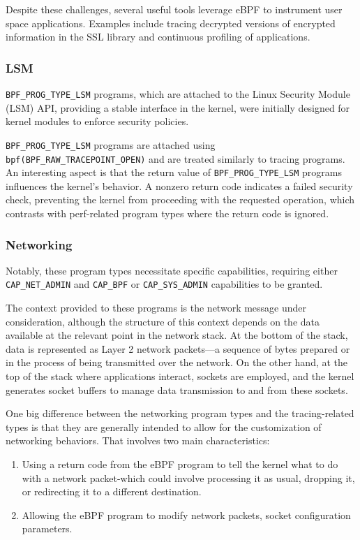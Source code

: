 Despite these challenges, several useful tools leverage eBPF to instrument user space applications. Examples include tracing decrypted versions of encrypted information in the SSL library and continuous profiling of applications.


\subsubsection{LSM}


\texttt{BPF\_PROG\_TYPE\_LSM} programs, which are attached to the Linux Security Module (LSM) API, providing a stable interface in the kernel, were initially designed for kernel modules to enforce security policies.

\texttt{BPF\_PROG\_TYPE\_LSM} programs are attached using \texttt{bpf(BPF\_RAW\_TRACEPOINT\_OPEN)} and are treated similarly to tracing programs. An interesting aspect is that the return value of 
\texttt{BPF\_PROG\_TYPE\_LSM} programs influences the kernel's behavior. A nonzero return code indicates a failed security check, preventing the kernel from proceeding with the requested operation, which contrasts with perf-related program types where the return code is ignored.


\subsubsection{Networking}

Notably, these program types necessitate specific capabilities, requiring either \texttt{CAP\_NET\_ADMIN} and \texttt{CAP\_BPF} or \texttt{CAP\_SYS\_ADMIN} capabilities to be granted.

The context provided to these programs is the network message under consideration, although the structure of this context depends on the data available at the relevant point in the network stack. At the bottom of the stack, data is represented as Layer 2 network packets—a sequence of bytes prepared or in the process of being transmitted over the network. On the other hand, at the top of the stack where applications interact, sockets are employed, and the kernel generates socket buffers to manage data transmission to and from these sockets.

One big difference between the networking program types and the tracing-related types is that they are generally intended to allow for the customization of networking behaviors. That involves two main characteristics:

\begin{enumerate}
    \item Using a return code from the eBPF program to tell the kernel what to do with a network packet-which could involve processing it as usual, dropping it, or redirecting it to a different destination. 
    \item Allowing the eBPF program to modify network packets, socket configuration parameters.
\end{enumerate}


